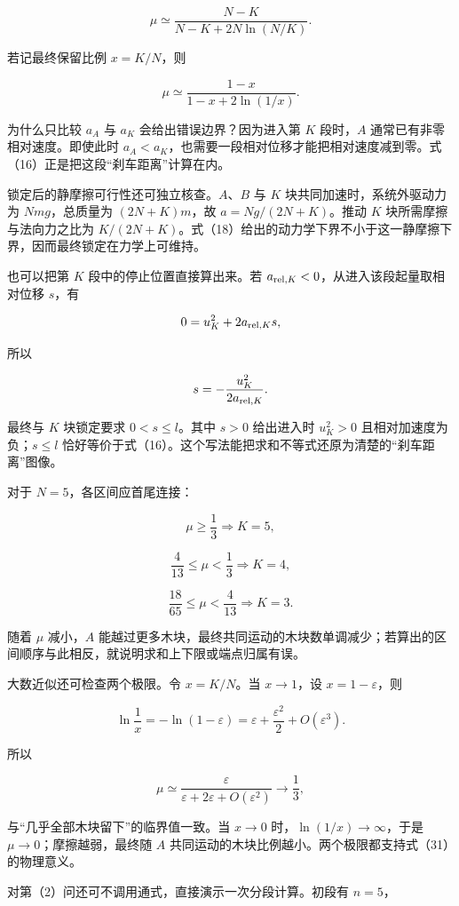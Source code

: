 \documentclass[12pt,a4paper,UTF8]{ctexart}
\begin{document}
\[
\boxed{
\mu\simeq
\frac{N-K}{N-K+2N\ln(N/K)} }. \tag{30}
\]

若记最终保留比例 \(x=K/N\)，则

\[
\boxed{
\mu\simeq\frac{1-x}{1-x+2\ln(1/x)}}. \tag{31}
\]

为什么只比较 \(a_A\) 与 \(a_K\) 会给出错误边界？因为进入第 \(K\)
段时，\(A\) 通常已有非零相对速度。即使此时
\(a_A<a_K\)，也需要一段相对位移才能把相对速度减到零。式（16）正是把这段``刹车距离''计算在内。

锁定后的静摩擦可行性还可独立核查。\(A\)、\(B\) 与 \(K\)
块共同加速时，系统外驱动力为 \(Nmg\)，总质量为 \((2N+K)m\)，故
\(a=Ng/(2N+K)\)。推动 \(K\) 块所需摩擦与法向力之比为
\(K/(2N+K)\)。式（18）给出的动力学下界不小于这一静摩擦下界，因而最终锁定在力学上可维持。

也可以把第 \(K\) 段中的停止位置直接算出来。若
\(a_{{\rm rel},K}<0\)，从进入该段起量取相对位移 \(s\)，有

\[
0=u_K^2+2a_{{\rm rel},K}s,
\]

所以

\[
s=-\frac{u_K^2}{2a_{{\rm rel},K}}.
\]

最终与 \(K\) 块锁定要求 \(0<s\le l\)。其中 \(s>0\) 给出进入时
\(u_K^2>0\) 且相对加速度为负；\(s\le l\)
恰好等价于式（16）。这个写法能把求和不等式还原为清楚的``刹车距离''图像。

对于 \(N=5\)，各区间应首尾连接：

\[
\mu\ge\frac13\Rightarrow K=5,
\]

\[
\frac4{13}\le\mu<\frac13\Rightarrow K=4,
\]

\[
\frac{18}{65}\le\mu<\frac4{13}\Rightarrow K=3.
\]

随着 \(\mu\) 减小，\(A\)
能越过更多木块，最终共同运动的木块数单调减少；若算出的区间顺序与此相反，就说明求和上下限或端点归属有误。

大数近似还可检查两个极限。令 \(x=K/N\)。当 \(x\to1\)，设
\(x=1-\varepsilon\)，则

\[
\ln\frac1x=-\ln(1-\varepsilon)
=\varepsilon+\frac{\varepsilon^2}{2}+O(\varepsilon^3).
\]

所以

\[
\mu\simeq
\frac{\varepsilon}{\varepsilon+2\varepsilon+O(\varepsilon^2)}
\to\frac13,
\]

与``几乎全部木块留下''的临界值一致。当 \(x\to0\)
时，\(\ln(1/x)\to\infty\)，于是 \(\mu\to0\)；摩擦越弱，最终随 \(A\)
共同运动的木块比例越小。两个极限都支持式（31）的物理意义。

对第（2）问还可不调用通式，直接演示一次分段计算。初段有 \(n=5\)，
\end{document}
